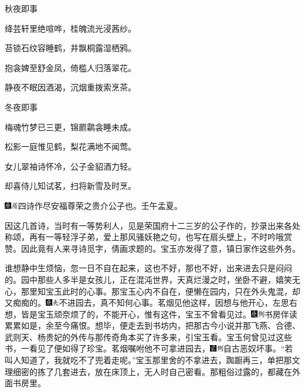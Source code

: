 秋夜即事

绛芸轩里绝喧哗，桂魄流光浸茜纱。

苔锁石纹容睡鹤，井飘桐露湿栖鸦。

抱衾婢至舒金凤，倚槛人归落翠花。

静夜不眠因酒渴，沉烟重拨索烹茶。

冬夜即事

梅魂竹梦已三更，锦罽鹴衾睡未成。

松影一庭惟见鹤，梨花满地不闻莺。

女儿翠袖诗怀冷，公子金貂酒力轻。

却喜侍儿知试茗，扫将新雪及时烹。

{\includegraphics[width=3mm]{../Images/00004}\includegraphics[width=3mm]{../Images/00010}\footnotesize \kaishu 四诗作尽安福尊荣之贵介公子也。壬午孟夏。}

因这几首诗，当时有一等势利人，见是荣国府十二三岁的公子作的，抄录出来各处称颂，再有一等轻浮子弟，爱上那风骚妖艳之句，也写在扇头壁上，不时吟哦赏赞。因此竟有人来寻诗觅字，倩画求题的。宝玉亦发得了意，镇日家作这些外务。

谁想静中生烦恼，忽一日不自在起来，这也不好，那也不好，出来进去只是闷闷的。园中那些人多半是女孩儿，正在混沌世界，天真烂漫之时，坐卧不避，嬉笑无心，那里知宝玉此时的心事。那宝玉心内不自在，便懒在园内，只在外头鬼混，却又痴痴的。{\includegraphics[width=3mm]{../Images/00004}\includegraphics[width=3mm]{../Images/00012}\footnotesize \kaishu 不进园去，真不知何心事。}茗烟见他这样，因想与他开心，左思右想，皆是宝玉顽奈烦了的，不能开心，惟有这件，宝玉不曾看见过。{\includegraphics[width=3mm]{../Images/00004}\includegraphics[width=3mm]{../Images/00011}\footnotesize \kaishu 书房伴读累累如是，余至今痛恨。}想毕，便走去到书坊内，把那古今小说并那飞燕、合德、武则天、杨贵妃的外传与那传奇角本买了许多来，引宝玉看。宝玉何曾见过这些书，一看见了便如得了珍宝。茗烟嘱咐他不可拿进园去，{\includegraphics[width=3mm]{../Images/00006}\includegraphics[width=3mm]{../Images/00011}\footnotesize \kaishu 自古恶奴坏事。}“若叫人知道了，我就吃不了兜着走呢。”宝玉那里舍的不拿进去，踟蹰再三，单把那文理细密的拣了几套进去，放在床顶上，无人时自己密看。那粗俗过露的，都藏在外面书房里。


